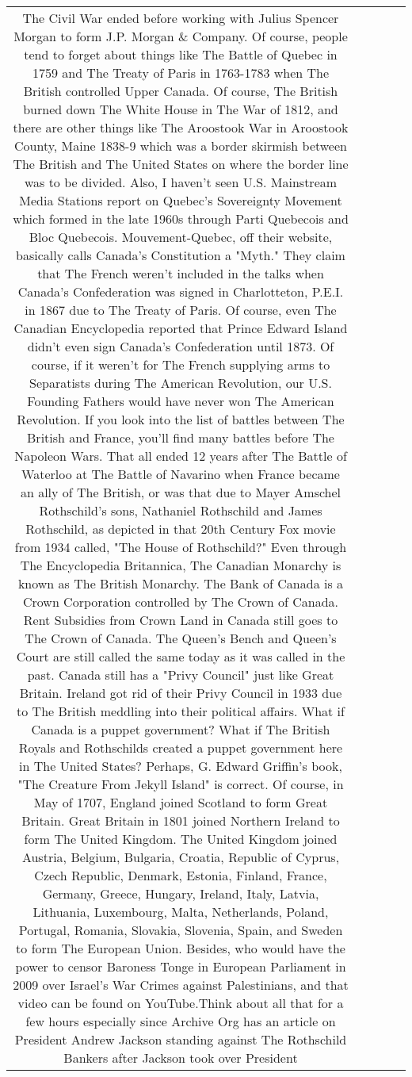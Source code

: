 \documentclass[11pt]{article}
\newlength\mylength
\begin{document}
\begin{center}
\begin{longtable}{|C{.65\mylength}|C{.30\mylength}|C{.12\mylength}|C{.12\mylength}|C{.12\mylength}|}
The Civil War ended before working with Julius Spencer Morgan to form J.P. Morgan \& Company. Of course, people tend to forget about things like The Battle of Quebec in 1759 and The Treaty of Paris in 1763-1783 when The British controlled Upper Canada. Of course, The British burned down The White House in The War of 1812, and there are other things like The Aroostook War in Aroostook County, Maine 1838-9 which was a border skirmish between The British and The United States on where the border line was to be divided. Also, I haven't seen U.S. Mainstream Media Stations report on Quebec's Sovereignty Movement which formed in the late 1960s through Parti Quebecois and Bloc Quebecois. Mouvement-Quebec, off their website, basically calls Canada's Constitution a "Myth." They claim that The French weren't included in the talks when Canada's Confederation was signed in Charlotteton, P.E.I. in 1867 due to The Treaty of Paris. Of course, even The Canadian Encyclopedia reported that Prince Edward Island didn't even sign Canada's Confederation until 1873. Of course, if it weren't for The French supplying arms to Separatists during The American Revolution, our U.S. Founding Fathers would have never won The American Revolution. If you look into the list of battles between The British and France, you'll find many battles before The Napoleon Wars. That all ended 12 years after The Battle of Waterloo at The Battle of Navarino when France became an ally of The British, or was that due to Mayer Amschel Rothschild's sons, Nathaniel Rothschild and James Rothschild, as depicted in that 20th Century Fox movie from 1934 called, "The House of Rothschild?" Even through The Encyclopedia Britannica, The Canadian Monarchy is known as The British Monarchy. The Bank of Canada is a Crown Corporation controlled by The Crown of Canada. Rent Subsidies from Crown Land in Canada still goes to The Crown of Canada. The Queen's Bench and Queen's Court are still called the same today as it was called in the past. Canada still has a "Privy Council" just like Great Britain. Ireland got rid of their Privy Council in 1933 due to The British meddling into their political affairs. What if Canada is a puppet government? What if The British Royals and Rothschilds created a puppet government here in The United States? Perhaps, G. Edward Griffin's book, "The Creature From Jekyll Island" is correct. Of course, in May of 1707, England joined Scotland to form Great Britain. Great Britain in 1801 joined Northern Ireland to form The United Kingdom. The United Kingdom joined Austria, Belgium, Bulgaria, Croatia, Republic of Cyprus, Czech Republic, Denmark, Estonia, Finland, France, Germany, Greece, Hungary, Ireland, Italy, Latvia, Lithuania, Luxembourg, Malta, Netherlands, Poland, Portugal, Romania, Slovakia, Slovenia, Spain, and Sweden to form The European Union. Besides, who would have the power to censor Baroness Tonge in European Parliament in 2009 over Israel's War Crimes against Palestinians, and that video can be found on YouTube.Think about all that for a few hours especially since Archive Org has an article on President Andrew Jackson standing against The Rothschild Bankers after Jackson took over President 
\end{longtable}
\end{center}
\end{document}
